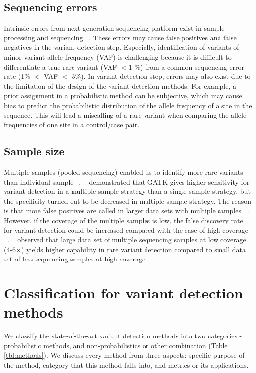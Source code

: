 \documentclass[11pt,reqno]{amsart}
\begin{document}
\subsection{Sequencing errors}
Intrinsic errors from next-generation sequencing platform exist in sample processing and sequencing ~\citep{Olson2015}.
These errors may cause false positives and false negatives in the variant detection step.
Especially, identification of variants of minor variant allele frequency (VAF) is challenging because it is difficult to differentiate a true rare variant (VAF $<$1 \%) from a common sequencing error rate (1\% $<$ VAF $<$ 3\%).
In variant detection step, errors may also exist due to the limitation of the design of the variant detection methods.
For example, a prior assignment in a probabilistic method can be subjective, which may cause bias to predict the probabilistic distribution of the allele frequency of a site in the sequence.
This will lead a miscalling of a rare variant when comparing the allele frequencies of one site in a control/case pair.

\subsection{Sample size}
Multiple samples (pooled sequencing) enabled us to identify more rare variants than individual sample ~\citep{Bao2014, liu2012steps}.
~\citep{liu2013variant} demonstrated that GATK gives higher sensitivity for variant detection in a multiple-sample strategy than a single-sample strategy, but the specificity turned out to be decreased in multiple-sample strategy.
The reason is that more false positives are called in larger data sets with multiple samples ~\citep{Nielsen2011}.
However, if the coverage of the multiple samples is low, the false discovery rate for variant detection could be increased compared with the case of high coverage ~\citep{Cheng2014}.
~\citep{le2011snp} observed that large data set of multiple sequencing samples at low coverage (4-6$\times$) yields higher capability in rare variant detection compared to small data set of less sequencing samples at high coverage.

\section{Classification for variant detection methods}
We classify the state-of-the-art variant detection methods into two categories - probabilistic methods, and non-probabilistics or other combination (Table \ref{tbl:methods}).
We discuss every method from three aspects: specific purpose of the method, category that this method falls into, and metrics or its applications.
\end{document}
